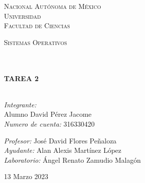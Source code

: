 \documentclass[14pt]{book}
\begin{document}
\begin{center}
\begin{minipage}{0.48\textwidth}
\begin{flushright}
    \end{flushright}
  \end{minipage}
  \vspace*{-1.5cm}
  \textsc{\huge Nacional Autónoma de México \\ \vspace{-4px} Universidad }\\[2cm]
  \textsc{\LARGE Facultad de Ciencias}\\[1.5cm]
  \begin{minipage}{0.9\textwidth}
    \begin{center}
      \textsc{\LARGE Sistemas Operativos}
    \end{center}
  \end{minipage}\\[0.5cm]
  \vspace*{1cm}
  \HRule \\[0.4cm]
  { \huge \bfseries TAREA 2}\\[0.4cm]
  \HRule \\[1.5cm]
  \begin{minipage}{0.52\textwidth}
    \begin{flushleft} \large \small \vspace{-0.6cm} \vspace{-0.6cm}
      \emph{Integrante:}\\
      Alumno David Pérez Jacome \\
      \emph{Numero de cuenta:} 316330420 \vspace*{2cm}
    \end{flushleft}
  \end{minipage}
  \begin{minipage}{0.46\textwidth}
    \vspace{-0.6cm}
    \begin{flushright} \large \small \emph{Profesor:}
      José David Flores Peñaloza \\
      \emph{Ayudante:}
      Alan Alexis Martínez López \\

      \emph{Laboratorio:}
      Ángel Renato Zamudio Malagón \\
    \end{flushright}
  \end{minipage}
  \vspace*{1cm}
  \vspace{2cm}
  \begin{center}
    {\large 13 Marzo 2023}
  \end{center}
\end{center}
\end{document}
